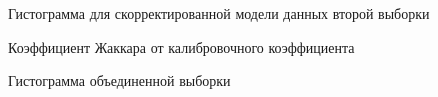 \begin{figure}[H]
	\caption{Гистограмма для скорректированной модели данных второй выборки}
	\label{fig:data2_hist_const}
\end{figure}
\begin{figure}[H]
	\caption{Коэффициент Жаккара от калибровочного коэффициента}
	\label{fig:jaccar}
\end{figure}
\begin{figure}[H]
	\caption{Гистограмма объединенной выборки}
	\label{fig:combined}
\end{figure}